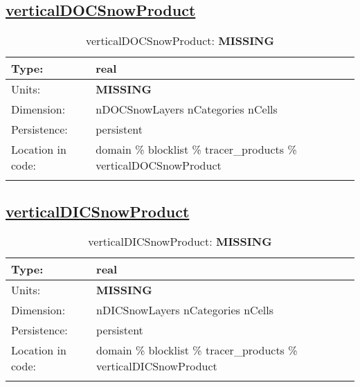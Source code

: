 \subsection[verticalDOCSnowProduct]{\hyperref[sec:var_tab_tracer_products]{verticalDOCSnowProduct}}
\label{subsec:var_sec_tracer_products_verticalDOCSnowProduct}
\begin{center}
\begin{longtable}{| p{2.0in} | p{4.0in} |}
        \hline 
        Type: & real \\
        \hline 
        Units: & {\bf \color{red} MISSING} \\
        \hline 
        Dimension: & nDOCSnowLayers nCategories nCells \\
        \hline 
        Persistence: & persistent \\
        \hline 
         Location in code: & domain \% blocklist \% tracer\_products \% verticalDOCSnowProduct \\
         \hline 
    \caption{verticalDOCSnowProduct: {\bf \color{red} MISSING}}
\end{longtable}
\end{center}
\subsection[verticalDICSnowProduct]{\hyperref[sec:var_tab_tracer_products]{verticalDICSnowProduct}}
\label{subsec:var_sec_tracer_products_verticalDICSnowProduct}
\begin{center}
\begin{longtable}{| p{2.0in} | p{4.0in} |}
        \hline 
        Type: & real \\
        \hline 
        Units: & {\bf \color{red} MISSING} \\
        \hline 
        Dimension: & nDICSnowLayers nCategories nCells \\
        \hline 
        Persistence: & persistent \\
        \hline 
         Location in code: & domain \% blocklist \% tracer\_products \% verticalDICSnowProduct \\
         \hline 
    \caption{verticalDICSnowProduct: {\bf \color{red} MISSING}}
\end{longtable}
\end{center}
